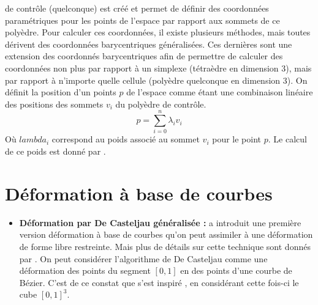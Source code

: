 \begin{itemize}
  de contrôle (quelconque) est créé et permet de définir des
  coordonnées paramétriques pour les points de l'espace par rapport
  aux sommets de ce polyèdre. Pour calculer ces coordonnées, il existe
  plusieurs méthodes, mais toutes dérivent des coordonnées
  barycentriques généralisées. Ces dernières sont une extension des
  coordonnés barycentriques afin de permettre de calculer des
  coordonnées non plus par rapport à un simplexe (tétraèdre en
  dimension 3), mais par rapport à n'importe quelle cellule (polyèdre
  quelconque en dimension 3). On définit la position d'un points $p$
  de l'espace comme étant une combinaison linéaire des positions des
  sommets $v_i$ du polyèdre de contrôle.
  \begin{equation}
    p = \sum_{i=0}^n \lambda_iv_i
  \end{equation}
  Où $lambda_i$ correspond au poids associé au sommet $v_i$ pour le point
  $p$. Le calcul de ce poids est donné par \cite{FKR05}.
\end{itemize}

\section{Déformation à base de courbes}
\begin{itemize}
\item{\textbf{Déformation par De Casteljau généralisée :}} \cite{CR94}
  a introduit une première version déformation à base de courbes qu'on
  peut assimiler à une déformation de forme libre restreinte. Mais
  plus de détails sur cette technique sont donnés par \cite{BE01}. On
  peut considérer l'algorithme de De Casteljau comme une déformation
  des points du segment $[0,1]$ en des points d'une courbe de
  Bézier. C'est de ce constat que s'est inspiré \cite{CR94}, en
  considérant cette fois-ci le cube $[0,1]^3$.
\end{itemize}

